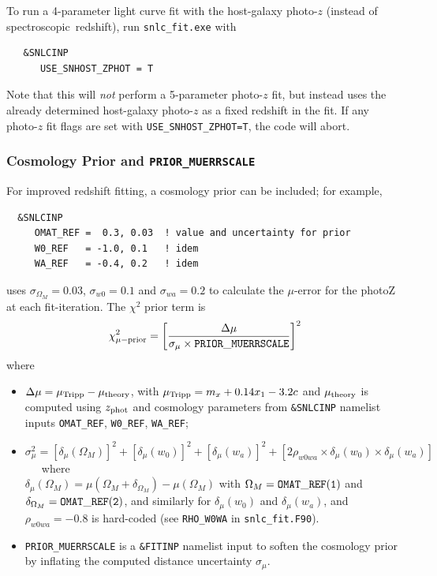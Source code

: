 \documentclass[12pt]{article}
\newcommand{\Zphot}{z_{\rm phot}}
\newcommand{\spec}{spectroscopic}
\newcommand{\OM}{\Omega_M}
\begin{document}
To run a 4-parameter light curve fit with the host-galaxy photo-$z$
(instead of \spec\ redshift), run {\tt snlc\_fit.exe} with
\begin{verbatim}
   &SNLCINP
      USE_SNHOST_ZPHOT = T
\end{verbatim}
Note that this will {\it not} perform a 5-parameter photo-$z$ fit, 
but instead uses the already determined host-galaxy photo-$z$
as a fixed redshift in the fit. If any photo-$z$ fit flags are set
with {\tt USE\_SNHOST\_ZPHOT=T}, the code will abort.


   \subsubsection{Cosmology Prior and {\tt PRIOR\_MUERRSCALE}}
   \label{sss:zphot_cosmology_prior}

For improved redshift fitting, a cosmology prior can be included;
for example,
\begin{verbatim}
  &SNLCINP
     OMAT_REF =  0.3, 0.03  ! value and uncertainty for prior 
     W0_REF   = -1.0, 0.1   ! idem
     WA_REF   = -0.4, 0.2   ! idem
\end{verbatim}
% 
uses $\sigma_{\OM}=0.03$, $\sigma_{w0}=0.1$ and $\sigma_{wa}=0.2$ to calculate
the $\mu$-error for the photoZ at each fit-iteration. 
The $\chi^2$ prior term is
\begin{equation}
   \chi_{\mu{\rm -prior}}^2 = \left[ \frac{ \Delta\mu  }{ \sigma_{\mu} \times {\rm\tt PRIOR\_MUERRSCALE} } \right]^2
   \label{eq:chi2_muprior}
\end{equation}
%
where 
\newcommand{\muTripp}{\mu_{\rm Tripp}}
\newcommand{\muTheory}{\mu_{\rm theory}}
\newcommand{\rhowowa}{\rho_{w0wa}}
\begin{itemize}
  \item $\Delta\mu = \muTripp - \muTheory$, with $\muTripp = m_x + 0.14x_1 - 3.2c$ and 
    $\muTheory$ is computed using $\Zphot$ and cosmology parameters from
    {\tt \&SNLCINP} namelist inputs {\tt OMAT\_REF}, {\tt W0\_REF}, {\tt WA\_REF};
    \item $\sigma_\mu^2 = [\delta_{\mu}(\OM)]^2 + [\delta_{\mu}(w_0)]^2 + [\delta_{\mu}(w_a)]^2 
          + [ 2 \rhowowa \times \delta_{\mu}(w_0) \times \delta_{\mu}(w_a)] $ ~~~where \\
          $\delta_{\mu}(\OM) = \mu({\OM} +\delta_{\OM}) - \mu(\OM)$
          with $\OM = {\rm\tt OMAT\_REF(1)}$ and $\delta_{\OM} = {\rm\tt OMAT\_REF(2)}$,
          and similarly for $\delta_{\mu}(w_0)$ and $\delta_{\mu}(w_a)$,
          and $\rhowowa = -0.8$ is hard-coded (see {\tt RHO\_W0WA} in {\tt snlc\_fit.F90}).
    \item {\rm\tt PRIOR\_MUERRSCALE} is a {\tt \&FITINP} namelist input to soften the cosmology prior
      by inflating the computed distance uncertainty $\sigma_{\mu}$.
\end{itemize}
\end{document}
